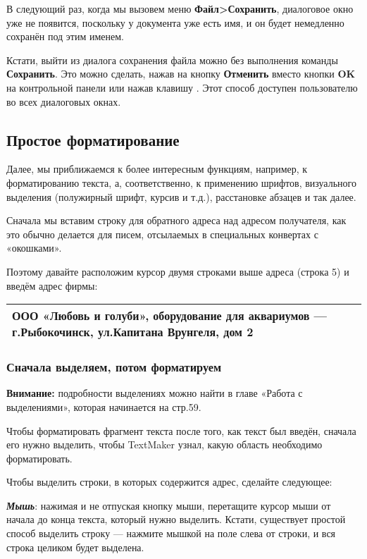 \documentclass[a4paper,10pt]{article}
\begin{document}
В следующий раз, когда мы вызовем меню \textbf{Файл>Сохранить}, диалоговое окно уже не появится, поскольку у документа уже есть имя, и он будет немедленно сохранён под этим именем.

Кстати, выйти из диалога сохранения файла можно без выполнения команды \textbf{Сохранить}. Это можно сделать, нажав на кнопку \textbf{Отменить} вместо кнопки \textbf{OK} на контрольной панели или нажав клавишу . Этот способ доступен пользователю во всех диалоговых окнах.

\subsection{Простое форматирование}
Далее, мы приближаемся к более интересным функциям, например, к форматированию текста, а, соответственно, к применению шрифтов, визуального выделения (полужирный шрифт, курсив и т.д.), расстановке абзацев и так далее.

Сначала мы вставим строку для обратного адреса над адресом получателя, как это обычно делается для писем, отсылаемых в специальных конвертах с «окошками».

Поэтому давайте расположим курсор двумя строками выше адреса (строка 5) и введём адрес фирмы:

\begin{center}
\begin{tabular}{ | m{15cm} | }
\hline
ООО «Любовь и голуби»,  оборудование для аквариумов — г.Рыбокочинск, ул.Капитана Врунгеля, дом 2\\
\hline
\end{tabular}
\end{center}

\subsubsection{Сначала выделяем, потом форматируем}
\textbf{Внимание:} подробности выделениях можно найти в главе «Работа с выделениями», которая начинается на стр.59.

Чтобы форматировать фрагмент текста после того, как текст был введён, сначала его нужно выделить, чтобы TextMaker узнал, какую область необходимо форматировать.

Чтобы выделить строки, в которых содержится адрес, сделайте следующее:

\textbf{\textit{Мышь}}: нажимая и не отпуская кнопку мыши, перетащите курсор мыши от начала до конца текста, который нужно выделить. Кстати, существует простой способ выделить строку --- нажмите мышкой на поле слева от  строки, и вся строка целиком будет выделена.
\end{document}
